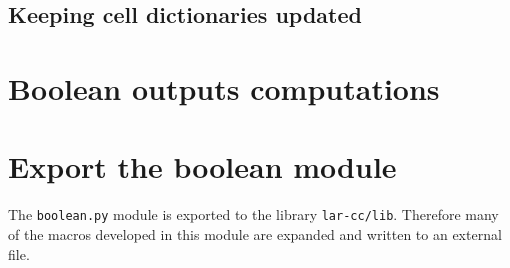 \documentclass[11pt,oneside]{article}	%
\begin{document}
\subsection{Keeping cell dictionaries updated}
\section{Boolean outputs computations}
\section{Export the boolean module}

The \texttt{boolean.py} module is exported to the library \texttt{lar-cc/lib}. Therefore many of the macros developed in this module are expanded and written to an external file.
\end{document}
